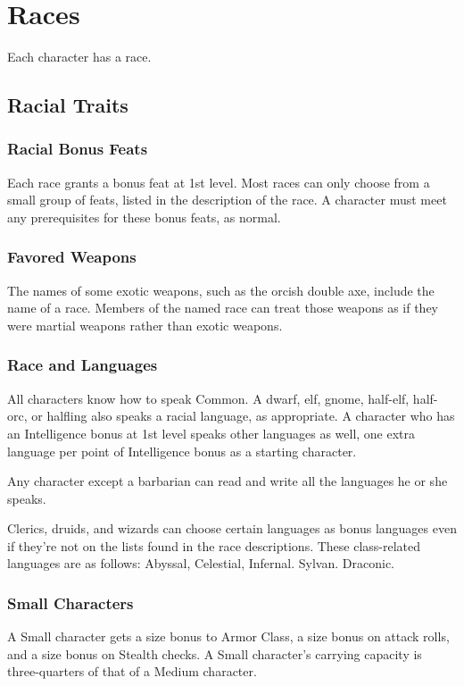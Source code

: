 \chapter{Races}

Each character has a race.

\section{Racial Traits}

\subsection{Racial Bonus Feats}
Each race grants a bonus feat at 1st level. Most races can only choose from a small group of feats, listed in the description of the race. A character must meet any prerequisites for these bonus feats, as normal.

\subsection{Favored Weapons}
The names of some exotic weapons, such as the orcish double axe, include the name of a race. Members of the named race can treat those weapons as if they were martial weapons rather than exotic weapons.

\subsection{Race and Languages}
All characters know how to speak Common. A dwarf, elf, gnome, half-elf, half-orc, or halfling also speaks a racial language, as appropriate. A character who has an Intelligence bonus at 1st level speaks other languages as well, one extra language per point of Intelligence bonus as a starting character.

 Any character except a barbarian can read and write all the languages he or she speaks.

 Clerics, druids, and wizards can choose certain languages as bonus languages even if they're not on the lists found in the race descriptions. These class-related languages are as follows:
 Abyssal, Celestial, Infernal.
 Sylvan.
 Draconic.

\subsection{Small Characters}
A Small character gets a  size bonus to Armor Class, a  size bonus on attack rolls, and a  size bonus on Stealth checks. A Small character's carrying capacity is three-quarters of that of a Medium character.

